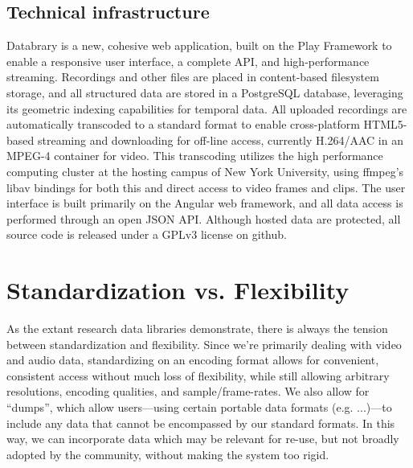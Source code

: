\documentclass{sig-alternate}
\begin{document}
\subsection{Technical infrastructure}


Databrary is a new, cohesive web application, built on the Play Framework to enable a responsive user interface, a complete API, and high-performance streaming.
Recordings and other files are placed in content-based filesystem storage, and all structured data are stored in a PostgreSQL database, leveraging its geometric indexing capabilities for temporal data.
All uploaded recordings are automatically transcoded to a standard format to enable cross-platform HTML5-based streaming and downloading for off-line access, currently H.264/AAC in an MPEG-4 container for video.
This transcoding utilizes the high performance computing cluster at the hosting campus of New York University, using ffmpeg's libav bindings for both this and direct access to video frames and clips.
The user interface is built primarily on the Angular web framework, and all data access is performed through an open JSON API.
Although hosted data are protected, all source code is released under a GPLv3 license on github.

\section{Standardization vs. Flexibility}

As the extant research data libraries demonstrate, there is always the tension between standardization and flexibility.
Since we're primarily dealing with video and audio data, standardizing on an encoding format allows for convenient, consistent access without much loss of flexibility, while still allowing arbitrary resolutions, encoding qualities, and sample/frame-rates.
We also allow for ``dumps'', which allow users---using certain portable data formats (e.g. ...)---to include any data that cannot be encompassed by our standard formats. In this way, we can incorporate data which may be relevant for re-use, but not broadly adopted by the community, without making the system too rigid.
\end{document}

